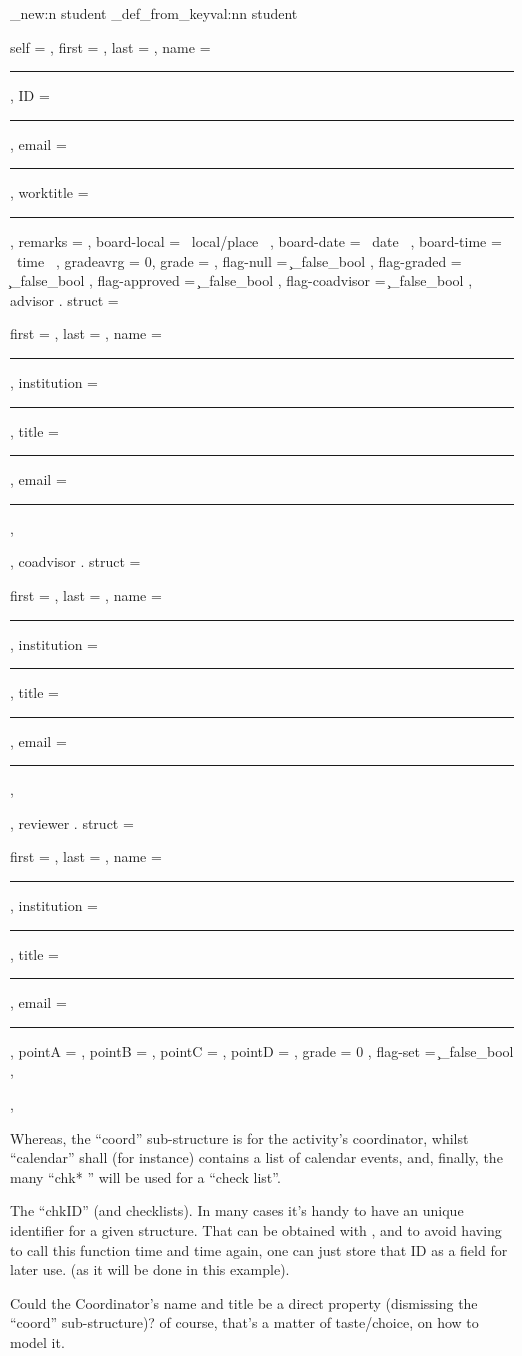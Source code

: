\documentclass[10pt]{article}
\begin{document}
\begin{codestore}
\starray_new:n {student}
\starray_def_from_keyval:nn {student} {
  self = , %
  first = ,
  last = ,
  name = \rule{\l__stdemo_name_rule_dim}{.1pt} ,
  ID    = \rule{\l__stdemo_ID_rule_dim}{.1pt} , 
  email = \rule{\l__stdemo_email_rule_dim}{.1pt} ,
  worktitle = \rule{\l__stdemo_worktitle_rule_dim}{.1pt} ,
  remarks = ,
  board-local = {~local/place~} ,
  board-date   = {~date~} ,
  board-time  = {~time~} ,
  gradeavrg = 0,
  grade = ,
  flag-null = \c_false_bool , %
  flag-graded = \c_false_bool , %
  flag-approved = \c_false_bool ,
  flag-coadvisor = \c_false_bool ,
  advisor . struct = {
    first = ,
    last =  ,
    name = \rule{\l__stdemo_name_rule_dim}{.1pt},
    institution = \rule{\l__stdemo_name_rule_dim}{.1pt},
    title = \rule{\l__stdemo_title_rule_dim}{.1pt} ,
    email = \rule{\l__stdemo_email_rule_dim}{.1pt} ,
  } ,
  coadvisor . struct = {
    first = ,
    last =  ,
    name = \rule{\l__stdemo_name_rule_dim}{.1pt},
    institution = \rule{\l__stdemo_name_rule_dim}{.1pt},
    title = \rule{\l__stdemo_title_rule_dim}{.1pt} ,
    email = \rule{\l__stdemo_email_rule_dim}{.1pt} ,
  } ,
  reviewer . struct = {
    first = ,
    last =  ,
    name = \rule{\l__stdemo_name_rule_dim}{.1pt},
    institution = \rule{\l__stdemo_name_rule_dim}{.1pt},
    title = \rule{\l__stdemo_title_rule_dim}{.1pt} ,
    email = \rule{\l__stdemo_email_rule_dim}{.1pt} ,
    pointA = ,
    pointB = ,
    pointC = ,
    pointD = ,
    grade = 0 ,
    flag-set = \c_false_bool , 
  } ,
 }
\end{codestore}







Whereas, the ``coord'' sub-structure is for the activity's coordinator, whilst ``calendar'' shall (for instance) contains a list of calendar events, and, finally, the many ``chk* '' will be used for a ``check list''.

\begin{tsremark}
The ``chkID'' (and checklists). In many cases it's handy to have an unique identifier for a given structure. That can be obtained with , and to avoid having to call this function time and time again, one can just store that ID as a field for later use. (as it will be done in this example).
\end{tsremark}
\begin{tsremark}
  Could the Coordinator's name and title be a direct property (dismissing the ``coord'' sub-structure)? of course, that's a matter of taste/choice, on how to model it.
\end{tsremark}
\end{document}
